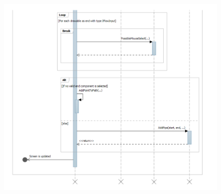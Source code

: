 \begin{figure}
	\centering
	\includegraphics[width=\textwidth]{figures/PresentationCreateConnection2.pdf}
\end{figure}